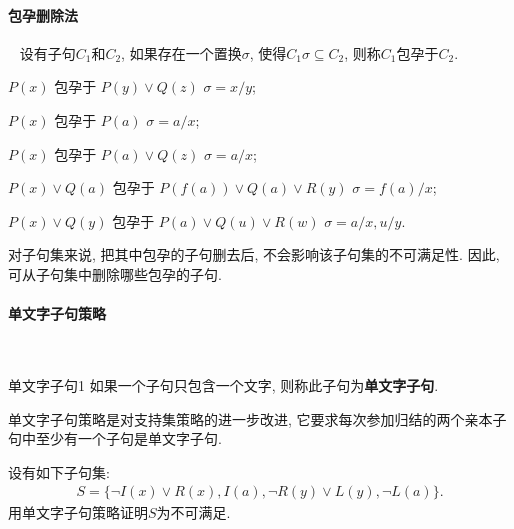 \paragraph{包孕删除法}~{}
    设有子句$C_1$和$C_2$, 如果存在一个置换$\sigma $, 使得$C_1\sigma \subseteq C_2$, 则称$C_1$包孕于$C_2$.
\begin{example}
    $P(x)$             包孕于   $P(y)\vee Q(z)$             $\sigma ={x/y}$;

    $P(x)$             包孕于   $P(a)$                      $\sigma ={a/x}$;

    $P(x)$             包孕于   $P(a)\vee Q(z)$             $\sigma ={a/x}$;

    $P(x) \vee Q(a)$ 包孕于 $P(f(a))\vee Q(a)\vee R(y)$    $\sigma ={f(a)/x}$;

    $P(x) \vee Q(y)$ 包孕于 $P(a)\vee Q(u)\vee R(w)$        $\sigma ={a/x, u/y}$.
\end{example}

对子句集来说, 把其中包孕的子句删去后, 不会影响该子句集的不可满足性. 因此, 可从子句集中删除哪些包孕的子句.
\paragraph{单文字子句策略}~{}
\begin{mydef}{单文字子句}{1}
    如果一个子句只包含一个文字, 则称此子句为\textbf{单文字子句}.
\end{mydef}
单文字子句策略是对支持集策略的进一步改进, 它要求每次参加归结的两个亲本子句中至少有一个子句是单文字子句.
\begin{example}
设有如下子句集:
\begin{align}
    S=\{\neg I(x)\vee R(x),  I(a), \neg R(y)\vee L(y), \neg L(a)\}.
\end{align}
用单文字子句策略证明$S$为不可满足.
\end{example}

